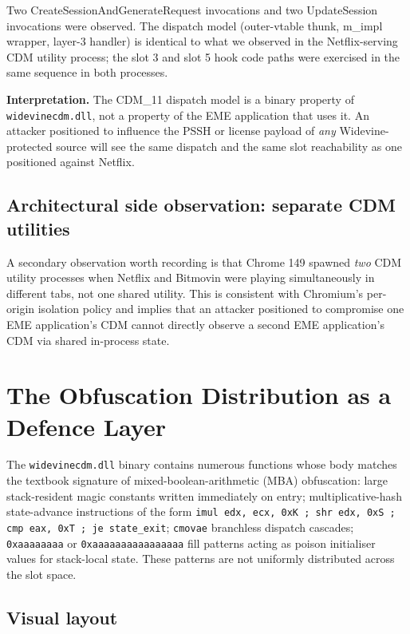 \documentclass[11pt,letterpaper]{article}
\let\oldsection\section
\renewcommand{\section}{\clearpage\oldsection}
\begin{document}
\noindent Two CreateSessionAndGenerateRequest invocations and two
UpdateSession invocations were observed. The dispatch model
(outer-vtable thunk, m\_impl wrapper, layer-3 handler) is identical
to what we observed in the Netflix-serving CDM utility process; the
slot 3 and slot 5 hook code paths were exercised in the same
sequence in both processes.

\textbf{Interpretation.} The CDM\_11 dispatch model is a binary
property of \texttt{widevinecdm.dll}, not a property of the EME
application that uses it. An attacker positioned to influence the
PSSH or license payload of \emph{any} Widevine-protected source
will see the same dispatch and the same slot reachability as one
positioned against Netflix.

\subsection{Architectural side observation: separate CDM utilities}

A secondary observation worth recording is that Chrome 149 spawned
\emph{two} CDM utility processes when Netflix and Bitmovin were
playing simultaneously in different tabs, not one shared utility.
This is consistent with Chromium's per-origin isolation policy and
implies that an attacker positioned to compromise one EME
application's CDM cannot directly observe a second EME application's
CDM via shared in-process state.

\section{The Obfuscation Distribution as a Defence Layer}
\label{sec:obfuscation}

The \texttt{widevinecdm.dll} binary contains numerous functions
whose body matches the textbook signature of mixed-boolean-arithmetic
(MBA) obfuscation: large stack-resident magic constants written
immediately on entry; multiplicative-hash state-advance instructions
of the form \texttt{imul edx, ecx, 0xK ; shr edx, 0xS ; cmp eax, 0xT
; je state\_exit}; \texttt{cmovae} branchless dispatch cascades;
\texttt{0xaaaaaaaa} or \texttt{0xaaaaaaaaaaaaaaaa} fill patterns
acting as poison initialiser values for stack-local state. These
patterns are not uniformly distributed across the slot space.

\subsection{Visual layout}
\end{document}
